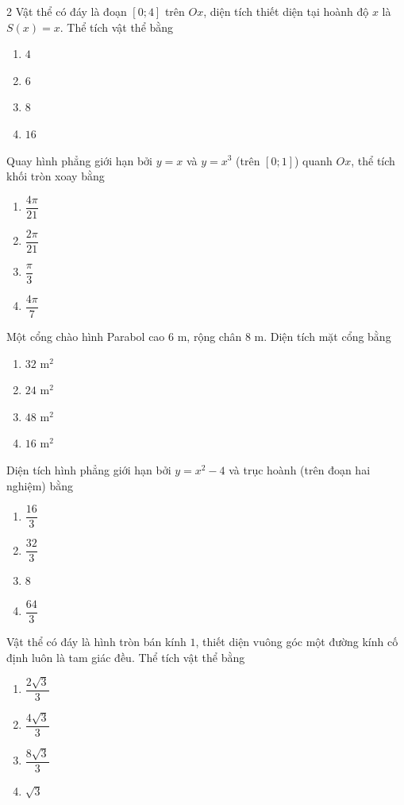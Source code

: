 \begin{multicols}{2}
\cauhoi Vật thể có đáy là đoạn $[0;4]$ trên $Ox$, diện tích thiết diện tại hoành độ $x$ là $S(x)=x$. Thể tích vật thể bằng
\begin{enumerate}[label=\textbf{\Alph*.}, leftmargin=0.9cm]
  \item $4$
  \item $6$
  \item $8$
  \item $16$
\end{enumerate}

\cauhoi Quay hình phẳng giới hạn bởi $y=x$ và $y=x^3$ (trên $[0;1]$) quanh $Ox$, thể tích khối tròn xoay bằng
\begin{enumerate}[label=\textbf{\Alph*.}, leftmargin=0.9cm]
  \item $\dfrac{4\pi}{21}$
  \item $\dfrac{2\pi}{21}$
  \item $\dfrac{\pi}{3}$
  \item $\dfrac{4\pi}{7}$
\end{enumerate}

\cauhoi Một cổng chào hình Parabol cao $6$ m, rộng chân $8$ m. Diện tích mặt cổng bằng
\begin{enumerate}[label=\textbf{\Alph*.}, leftmargin=0.9cm]
  \item $32$ m$^2$
  \item $24$ m$^2$
  \item $48$ m$^2$
  \item $16$ m$^2$
\end{enumerate}

\cauhoi Diện tích hình phẳng giới hạn bởi $y=x^2-4$ và trục hoành (trên đoạn hai nghiệm) bằng
\begin{enumerate}[label=\textbf{\Alph*.}, leftmargin=0.9cm]
  \item $\dfrac{16}{3}$
  \item $\dfrac{32}{3}$
  \item $8$
  \item $\dfrac{64}{3}$
\end{enumerate}

\cauhoi Vật thể có đáy là hình tròn bán kính $1$, thiết diện vuông góc một đường kính cố định luôn là tam giác đều. Thể tích vật thể bằng
\begin{enumerate}[label=\textbf{\Alph*.}, leftmargin=0.9cm]
  \item $\dfrac{2\sqrt3}{3}$
  \item $\dfrac{4\sqrt3}{3}$
  \item $\dfrac{8\sqrt3}{3}$
  \item $\sqrt3$
\end{enumerate}


\end{multicols}
